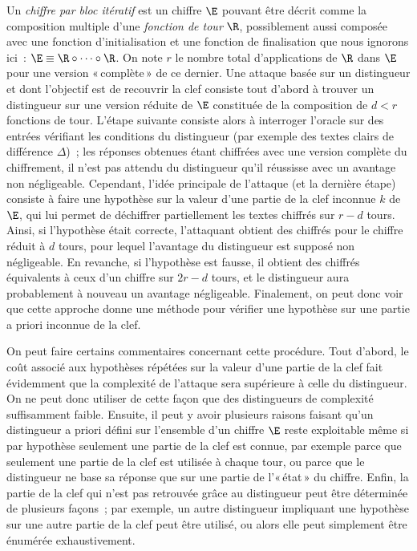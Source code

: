 Un  \emph{chiffre par bloc itératif} est un chiffre $\E$ pouvant être décrit comme la composition multiple
d'une \emph{fonction de tour} $\R$, possiblement aussi composée avec une fonction d'initialisation et une fonction de finalisation
que nous ignorons ici~:
$\E \equiv \R \circ \cdots \circ \R$. On note $r$ le nombre total d'applications de $\R$ dans $\E$ pour une version «\,complète\,» de ce dernier.
Une attaque basée sur un distingueur et dont l'objectif est de recouvrir la clef consiste tout d'abord à trouver un distingueur sur une version
réduite de $\E$ constituée de la composition de $d < r$ fonctions de tour. L'étape suivante consiste alors à interroger l'oracle sur
des entrées vérifiant les conditions du distingueur (par exemple des textes clairs de différence $\Delta$)~; les réponses obtenues étant chiffrées
avec une version complète du chiffrement, il n'est pas attendu du distingueur qu'il réussisse avec un avantage non négligeable.
Cependant, l'idée principale de l'attaque (et la dernière étape) consiste à faire
une hypothèse sur la valeur d'une partie de la clef inconnue $k$ de $\E$,
qui lui permet de déchiffrer partiellement les textes chiffrés sur $r-d$ tours. Ainsi, si l'hypothèse était correcte, l'attaquant obtient des chiffrés pour le
chiffre réduit à $d$ tours, pour lequel l'avantage du distingueur est supposé non négligeable.
En revanche, si l'hypothèse est fausse,
il obtient des chiffrés équivalents à ceux d'un chiffre sur $2r - d$ tours, et le distingueur aura probablement à nouveau un avantage négligeable.
Finalement, on peut donc
voir que cette approche donne une méthode pour vérifier une hypothèse sur une partie a priori inconnue de la clef.

On peut faire certains commentaires concernant cette procédure. Tout d'abord, le coût associé aux hypothèses répétées sur la valeur d'une partie de la clef
fait évidemment que la complexité de l'attaque sera supérieure à celle du distingueur. On ne peut donc utiliser de cette façon que
des distingueurs de complexité suffisamment faible.
Ensuite, il peut y avoir plusieurs raisons faisant qu'un distingueur a priori défini sur l'ensemble d'un
chiffre $\E$ reste exploitable même si par hypothèse seulement une partie de la clef est connue, par exemple
parce que seulement une partie de la clef est utilisée à chaque tour, ou parce que le distingueur ne base sa réponse que sur une partie de l'«\,état\,» du chiffre.
Enfin, la partie de la clef qui n'est pas retrouvée grâce au distingueur peut être déterminée de plusieurs façons~; par exemple, un autre distingueur
impliquant une hypothèse sur une autre partie de la clef peut être utilisé, ou alors elle peut simplement être énumérée exhaustivement.


